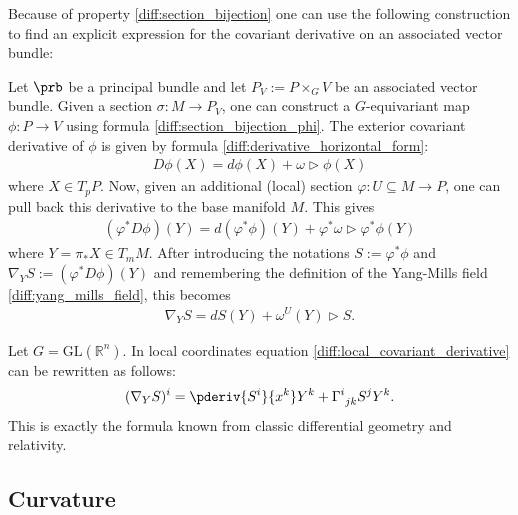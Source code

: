     Because of property \ref{diff:section_bijection} one can use the following construction to find an explicit expression for the covariant derivative on an associated vector bundle:
    \begin{construct}\label{diff:covariant_derivative_associated_bundle}
        Let $\prb$ be a principal bundle and let $P_V := P\times_G V$ be an associated vector bundle. Given a section $\sigma:M\rightarrow P_V$, one can construct a $G$-equivariant map $\phi:P\rightarrow V$ using formula \ref{diff:section_bijection_phi}. The exterior covariant derivative of $\phi$ is given by formula \ref{diff:derivative_horizontal_form}:
        \begin{gather}
            D\phi(X) = d\phi(X) + \omega\triangleright\phi(X)
        \end{gather}
        where $X\in T_pP$. Now, given an additional (local) section $\varphi:U\subseteq M\rightarrow P$, one can pull back this derivative to the base manifold $M$. This gives
        \begin{gather}
            (\varphi^*D\phi)(Y) = d(\varphi^*\phi)(Y) + \varphi^*\omega\triangleright\varphi^*\phi(Y)
        \end{gather}
        where $Y=\pi_*X\in T_mM$. After introducing the notations $S:=\varphi^*\phi$ and $\nabla_YS:=(\varphi^*D\phi)(Y)$ and remembering the definition of the Yang-Mills field \ref{diff:yang_mills_field}, this becomes
        \begin{gather}
            \label{diff:local_covariant_derivative}
            \nabla_YS = dS(Y) + \omega^U(Y)\triangleright S.
        \end{gather}
    \end{construct}
    \begin{example}
        Let $G=\text{GL}(\mathbb{R}^n)$. In local coordinates equation \ref{diff:local_covariant_derivative} can be rewritten as follows:
        \begin{gather}
            (\nabla_YS)^i = \pderiv{S^i}{x^k}Y^k + \Gamma^i_{\ jk}S^jY^k.
        \end{gather}
        This is exactly the formula known from classic differential geometry and relativity.
    \end{example}

\subsection{Curvature}


